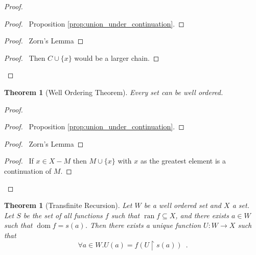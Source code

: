 \documentclass{report}
\let\qed\relax
\newtheorem{thm}[ax]{Theorem}
\theoremstyle{definition}
\newcommand{\dom}{\ensuremath{\operatorname{dom}}}
\newcommand{\ran}{\ensuremath{\operatorname{ran}}}
\begin{document}
\begin{proof}
\pf
{}
\begin{proof}
	\pf\ Proposition \ref{prop:union_under_continuation}.
\end{proof}
\begin{proof}
	\pf\ Zorn's Lemma
\end{proof}
\begin{proof}
	\pf\ Then $C \cup \{x\}$ would be a larger chain.
\end{proof}
\qed
\end{proof}

\begin{thm}[Well Ordering Theorem]
Every set can be well ordered.
\end{thm}

\begin{proof}
\pf
{}
\begin{proof}
	\pf\ Proposition \ref{prop:union_under_continuation}.
\end{proof}
\begin{proof}
	\pf\ Zorn's Lemma
\end{proof}
\begin{proof}
	\pf\ If $x \in X - M$ then $M \cup \{x\}$ with $x$ as the greatest element is a continuation of $M$.
\end{proof}
\qed
\end{proof}

\begin{thm}[Transfinite Recursion]
Let $W$ be a well ordered set and $X$ a set. Let $S$ be the set of all functions $f$ such that $\ran f \subseteq X$, and there exists $a \in W$ such that $\dom f = s(a)$. Then there exists a unique function $U : W \rightarrow X$ such that
\[ \forall a \in W. U(a) = f(U \restriction s(a)) \enspace . \]
\end{thm}
\end{document}
